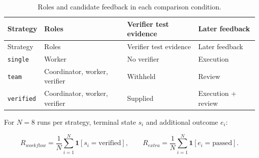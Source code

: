 \begin{longtable}[]{@{}
  >{\raggedright\arraybackslash}p{}
  >{\raggedright\arraybackslash}p{}
  >{\raggedright\arraybackslash}p{}
  >{\raggedright\arraybackslash}p{}@{}}
\caption[Comparison strategies]{Roles and candidate feedback in each comparison condition.}\label{tab:6-5}\tabularnewline
\toprule\noalign{}
\begin{minipage}[b]{\linewidth}\raggedright
Strategy
\end{minipage} & \begin{minipage}[b]{\linewidth}\raggedright
Roles
\end{minipage} & \begin{minipage}[b]{\linewidth}\raggedright
Verifier test evidence
\end{minipage} & \begin{minipage}[b]{\linewidth}\raggedright
Later feedback
\end{minipage} \\
\midrule\noalign{}
\endfirsthead
\toprule\noalign{}
\begin{minipage}[b]{\linewidth}\raggedright
Strategy
\end{minipage} & \begin{minipage}[b]{\linewidth}\raggedright
Roles
\end{minipage} & \begin{minipage}[b]{\linewidth}\raggedright
Verifier test evidence
\end{minipage} & \begin{minipage}[b]{\linewidth}\raggedright
Later feedback
\end{minipage} \\
\midrule\noalign{}
\endhead
\bottomrule\noalign{}
\endlastfoot
\texttt{single} & Worker & No verifier & Execution \\
\texttt{team} & Coordinator, worker, verifier & Withheld & Review \\
\texttt{verified} & Coordinator, worker, verifier & Supplied & Execution + review \\
\end{longtable}

For \(N=8\) runs per strategy, terminal state \(s_i\) and additional outcome \(e_i\):

\begin{equation}
R_{workflow}=\frac{1}{N}\sum_{i=1}^{N}\mathbf{1}[s_i=\mathrm{verified}],
\qquad
R_{extra}=\frac{1}{N}\sum_{i=1}^{N}\mathbf{1}[e_i=\mathrm{passed}].\label{eq:6-1}
\end{equation}

